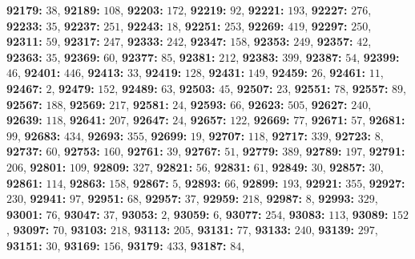 \textsf{\bfseries 92179:} $38$, \textsf{\bfseries 92189:} $108$, \textsf{\bfseries 92203:} $172$, \textsf{\bfseries 92219:} $92$, \textsf{\bfseries 92221:} $193$, \textsf{\bfseries 92227:} $276$, \textsf{\bfseries 92233:} $35$, \textsf{\bfseries 92237:} $251$, \textsf{\bfseries 92243:} $18$, \textsf{\bfseries 92251:} $253$, \textsf{\bfseries 92269:} $419$, \textsf{\bfseries 92297:} $250$, \textsf{\bfseries 92311:} $59$, \textsf{\bfseries 92317:} $247$, \textsf{\bfseries 92333:} $242$, \textsf{\bfseries 92347:} $158$, \textsf{\bfseries 92353:} $249$, \textsf{\bfseries 92357:} $42$, \textsf{\bfseries 92363:} $35$, \textsf{\bfseries 92369:} $60$, \textsf{\bfseries 92377:} $85$, \textsf{\bfseries 92381:} $212$, \textsf{\bfseries 92383:} $399$, \textsf{\bfseries 92387:} $54$, \textsf{\bfseries 92399:} $46$, \textsf{\bfseries 92401:} $446$, \textsf{\bfseries 92413:} $33$, \textsf{\bfseries 92419:} $128$, \textsf{\bfseries 92431:} $149$, \textsf{\bfseries 92459:} $26$, \textsf{\bfseries 92461:} $11$, \textsf{\bfseries 92467:} $2$, \textsf{\bfseries 92479:} $152$, \textsf{\bfseries 92489:} $63$, \textsf{\bfseries 92503:} $45$, \textsf{\bfseries 92507:} $23$, \textsf{\bfseries 92551:} $78$, \textsf{\bfseries 92557:} $89$, \textsf{\bfseries 92567:} $188$, \textsf{\bfseries 92569:} $217$, \textsf{\bfseries 92581:} $24$, \textsf{\bfseries 92593:} $66$, \textsf{\bfseries 92623:} $505$, \textsf{\bfseries 92627:} $240$, \textsf{\bfseries 92639:} $118$, \textsf{\bfseries 92641:} $207$, \textsf{\bfseries 92647:} $24$, \textsf{\bfseries 92657:} $122$, \textsf{\bfseries 92669:} $77$, \textsf{\bfseries 92671:} $57$, \textsf{\bfseries 92681:} $99$, \textsf{\bfseries 92683:} $434$, \textsf{\bfseries 92693:} $355$, \textsf{\bfseries 92699:} $19$, \textsf{\bfseries 92707:} $118$, \textsf{\bfseries 92717:} $339$, \textsf{\bfseries 92723:} $8$, \textsf{\bfseries 92737:} $60$, \textsf{\bfseries 92753:} $160$, \textsf{\bfseries 92761:} $39$, \textsf{\bfseries 92767:} $51$, \textsf{\bfseries 92779:} $389$, \textsf{\bfseries 92789:} $197$, \textsf{\bfseries 92791:} $206$, \textsf{\bfseries 92801:} $109$, \textsf{\bfseries 92809:} $327$, \textsf{\bfseries 92821:} $56$, \textsf{\bfseries 92831:} $61$, \textsf{\bfseries 92849:} $30$, \textsf{\bfseries 92857:} $30$, \textsf{\bfseries 92861:} $114$, \textsf{\bfseries 92863:} $158$, \textsf{\bfseries 92867:} $5$, \textsf{\bfseries 92893:} $66$, \textsf{\bfseries 92899:} $193$, \textsf{\bfseries 92921:} $355$, \textsf{\bfseries 92927:} $230$, \textsf{\bfseries 92941:} $97$, \textsf{\bfseries 92951:} $68$, \textsf{\bfseries 92957:} $37$, \textsf{\bfseries 92959:} $218$, \textsf{\bfseries 92987:} $8$, \textsf{\bfseries 92993:} $329$, \textsf{\bfseries 93001:} $76$, \textsf{\bfseries 93047:} $37$, \textsf{\bfseries 93053:} $2$, \textsf{\bfseries 93059:} $6$, \textsf{\bfseries 93077:} $254$, \textsf{\bfseries 93083:} $113$, \textsf{\bfseries 93089:} $152$, \textsf{\bfseries 93097:} $70$, \textsf{\bfseries 93103:} $218$, \textsf{\bfseries 93113:} $205$, \textsf{\bfseries 93131:} $77$, \textsf{\bfseries 93133:} $240$, \textsf{\bfseries 93139:} $297$, \textsf{\bfseries 93151:} $30$, \textsf{\bfseries 93169:} $156$, \textsf{\bfseries 93179:} $433$, \textsf{\bfseries 93187:} $84$, 

